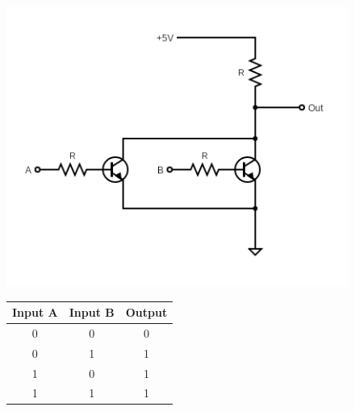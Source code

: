     \begin{figure}[H]   
        \begin{minipage}{0.5\textwidth}
            \centering
            \includegraphics[width=1.1\textwidth]{figures/circuits/OR.png}
            \label{fig:OR_circuit} 
        \end{minipage}
        \begin{minipage}{0.5\textwidth}
            \centering
            \begin{tabular}{|c|c|c|}
                \hline
                Input A & Input B & Output \\
                \hline
                0 & 0 & 0 \\
                0 & 1 & 1 \\
                1 & 0 & 1 \\
                1 & 1 & 1 \\
                \hline
            \end{tabular}
            \label{tab:OR_table}
        \end{minipage}
	\end{figure}

